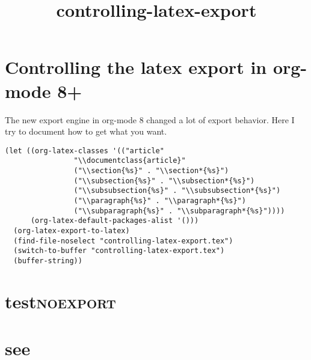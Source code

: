 \documentclass{revtex4}
\title{controlling-latex-export}
\begin{document}
\maketitle

\section{Controlling the latex export in org-mode 8+}
\label{sec-1}

The new export engine in org-mode 8 changed a lot of export behavior. Here I try to document how to get what you want. 

\begin{verbatim}
(let ((org-latex-classes '(("article"
			    "\\documentclass{article}"
			    ("\\section{%s}" . "\\section*{%s}")
			    ("\\subsection{%s}" . "\\subsection*{%s}")
			    ("\\subsubsection{%s}" . "\\subsubsection*{%s}")
			    ("\\paragraph{%s}" . "\\paragraph*{%s}")
			    ("\\subparagraph{%s}" . "\\subparagraph*{%s}"))))
      (org-latex-default-packages-alist '()))
  (org-latex-export-to-latex)
  (find-file-noselect "controlling-latex-export.tex")
  (switch-to-buffer "controlling-latex-export.tex")
  (buffer-string))
\end{verbatim}


\section{test\hfill{}\textsc{noexport}}
\label{sec-2}
\section{see}
\label{sec-3}
\end{document}
